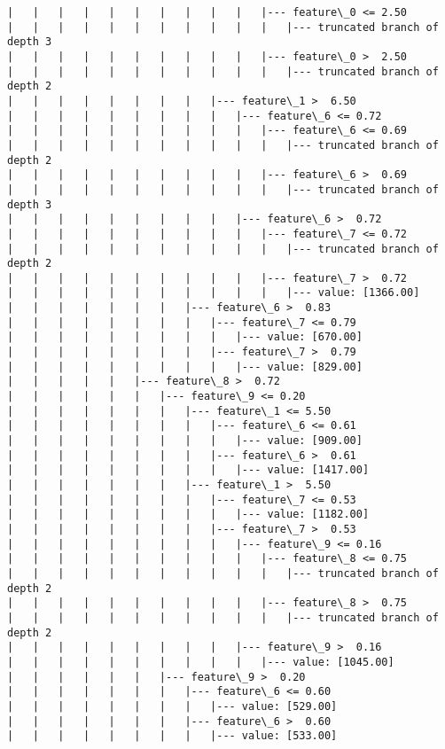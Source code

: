 \documentclass[11pt]{article}
\begin{document}
\begin{Verbatim}[commandchars=\\\{\}]
|   |   |   |   |   |   |   |   |   |   |--- feature\_0 <= 2.50
|   |   |   |   |   |   |   |   |   |   |   |--- truncated branch of depth 3
|   |   |   |   |   |   |   |   |   |   |--- feature\_0 >  2.50
|   |   |   |   |   |   |   |   |   |   |   |--- truncated branch of depth 2
|   |   |   |   |   |   |   |   |--- feature\_1 >  6.50
|   |   |   |   |   |   |   |   |   |--- feature\_6 <= 0.72
|   |   |   |   |   |   |   |   |   |   |--- feature\_6 <= 0.69
|   |   |   |   |   |   |   |   |   |   |   |--- truncated branch of depth 2
|   |   |   |   |   |   |   |   |   |   |--- feature\_6 >  0.69
|   |   |   |   |   |   |   |   |   |   |   |--- truncated branch of depth 3
|   |   |   |   |   |   |   |   |   |--- feature\_6 >  0.72
|   |   |   |   |   |   |   |   |   |   |--- feature\_7 <= 0.72
|   |   |   |   |   |   |   |   |   |   |   |--- truncated branch of depth 2
|   |   |   |   |   |   |   |   |   |   |--- feature\_7 >  0.72
|   |   |   |   |   |   |   |   |   |   |   |--- value: [1366.00]
|   |   |   |   |   |   |   |--- feature\_6 >  0.83
|   |   |   |   |   |   |   |   |--- feature\_7 <= 0.79
|   |   |   |   |   |   |   |   |   |--- value: [670.00]
|   |   |   |   |   |   |   |   |--- feature\_7 >  0.79
|   |   |   |   |   |   |   |   |   |--- value: [829.00]
|   |   |   |   |   |--- feature\_8 >  0.72
|   |   |   |   |   |   |--- feature\_9 <= 0.20
|   |   |   |   |   |   |   |--- feature\_1 <= 5.50
|   |   |   |   |   |   |   |   |--- feature\_6 <= 0.61
|   |   |   |   |   |   |   |   |   |--- value: [909.00]
|   |   |   |   |   |   |   |   |--- feature\_6 >  0.61
|   |   |   |   |   |   |   |   |   |--- value: [1417.00]
|   |   |   |   |   |   |   |--- feature\_1 >  5.50
|   |   |   |   |   |   |   |   |--- feature\_7 <= 0.53
|   |   |   |   |   |   |   |   |   |--- value: [1182.00]
|   |   |   |   |   |   |   |   |--- feature\_7 >  0.53
|   |   |   |   |   |   |   |   |   |--- feature\_9 <= 0.16
|   |   |   |   |   |   |   |   |   |   |--- feature\_8 <= 0.75
|   |   |   |   |   |   |   |   |   |   |   |--- truncated branch of depth 2
|   |   |   |   |   |   |   |   |   |   |--- feature\_8 >  0.75
|   |   |   |   |   |   |   |   |   |   |   |--- truncated branch of depth 2
|   |   |   |   |   |   |   |   |   |--- feature\_9 >  0.16
|   |   |   |   |   |   |   |   |   |   |--- value: [1045.00]
|   |   |   |   |   |   |--- feature\_9 >  0.20
|   |   |   |   |   |   |   |--- feature\_6 <= 0.60
|   |   |   |   |   |   |   |   |--- value: [529.00]
|   |   |   |   |   |   |   |--- feature\_6 >  0.60
|   |   |   |   |   |   |   |   |--- value: [533.00]

\end{Verbatim}
\end{document}
